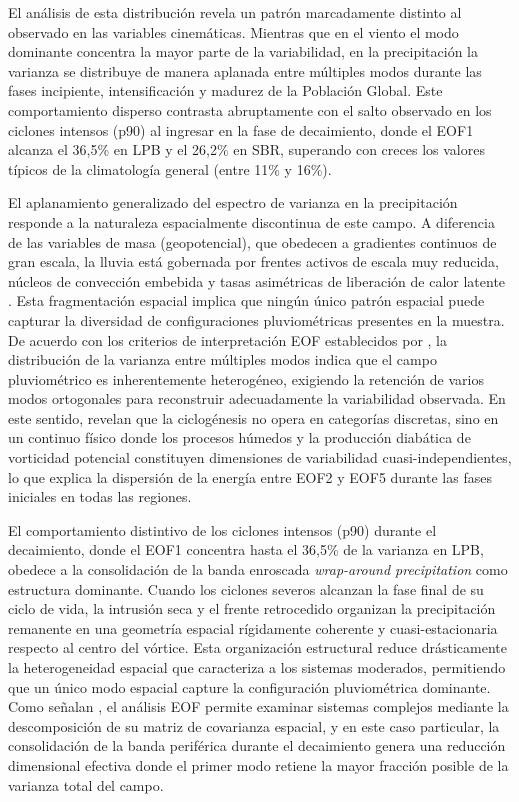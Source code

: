 El análisis de esta distribución revela un patrón marcadamente distinto al observado en las variables cinemáticas. Mientras que en el viento el modo dominante concentra la mayor parte de la variabilidad, en la precipitación la varianza se distribuye de manera aplanada entre múltiples modos durante las fases incipiente, intensificación y madurez de la Población Global.
Este comportamiento disperso contrasta abruptamente con el salto observado en los ciclones intensos (p90) al ingresar en la fase de decaimiento, donde el EOF1 alcanza el 36,5\% en LPB y el 26,2\% en SBR, superando con creces los valores típicos de la climatología general (entre 11\% y 16\%).

El aplanamiento generalizado del espectro de varianza en la precipitación responde a la naturaleza espacialmente discontinua de este campo. 
A diferencia de las variables de masa (geopotencial), que obedecen a gradientes continuos de gran escala, la lluvia está gobernada por frentes activos de escala muy reducida, núcleos de convección embebida y tasas asimétricas de liberación de calor latente \citep{oertel2021warm}. 
Esta fragmentación espacial implica que ningún único patrón espacial puede capturar la diversidad de configuraciones pluviométricas presentes en la muestra. 
De acuerdo con los criterios de interpretación EOF establecidos por \citet{hannachi2007empirical}, la distribución de la varianza entre múltiples modos indica que el campo pluviométrico es inherentemente heterogéneo, exigiendo la retención de varios modos ortogonales para reconstruir adecuadamente la variabilidad observada. 
En este sentido, \citet{graf2017objective} revelan que la ciclogénesis no opera en categorías discretas, sino en un continuo físico donde los procesos húmedos y la producción diabática de vorticidad potencial constituyen dimensiones de variabilidad cuasi-independientes, lo que explica la dispersión de la energía entre EOF2 y EOF5 durante las fases iniciales en todas las regiones.

El comportamiento distintivo de los ciclones intensos (p90) durante el decaimiento, donde el EOF1 concentra hasta el 36,5\% de la varianza en LPB, obedece a la consolidación de la banda enroscada \textit{wrap-around precipitation} como estructura dominante. 
Cuando los ciclones severos alcanzan la fase final de su ciclo de vida, la intrusión seca y el frente retrocedido organizan la precipitación remanente en una geometría espacial rígidamente coherente y cuasi-estacionaria respecto al centro del vórtice. 
Esta organización estructural reduce drásticamente la heterogeneidad espacial que caracteriza a los sistemas moderados, permitiendo que un único modo espacial capture la configuración pluviométrica dominante. 
Como señalan \citet{hannachi2023eof}, el análisis EOF permite examinar sistemas complejos mediante la descomposición de su matriz de covarianza espacial, y en este caso particular, la consolidación de la banda periférica durante el decaimiento genera una reducción dimensional efectiva donde el primer modo retiene la mayor fracción posible de la varianza total del campo.

